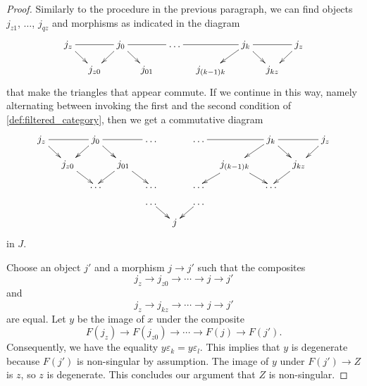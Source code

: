 \begin{proof}
Similarly to the procedure in the previous paragraph, we can find objects $j_{z1}$, $\dots$, $j_{qz}$ and morphisms as indicated in the diagram
\begin{displaymath}
\xymatrix@=1em{
j_z \ar[dr] \ar@{-}[rr] && j_0 \ar[ld] \ar[dr] \ar@{-}[rr] && \dots \ar@{-}[rr] && j_k \ar[ld] \ar[dr] \ar@{-}[rr] && j_z \ar[ld] \\
& j_{z0} && j_{01} && j_{(k-1)k} && j_{kz}
}
\end{displaymath}
that make the triangles that appear commute. If we continue in this way, namely alternating between invoking the first and the second condition of \cref{def:filtered_category}, then we get a commutative diagram
\begin{displaymath}
\xymatrix@=1em{
j_z \ar[dr] \ar@{-}[rr] && j_0 \ar[ld] \ar[dr] \ar@{-}[rr] && \dots && \dots \ar@{-}[rr] && j_k \ar[ld] \ar[dr] \ar@{-}[rr] && j_z \ar[ld] \\
& j_{z0} \ar[dr] && j_{01} \ar[ld] \ar[dr] &&&& j_{(k-1)k} \ar[ld] \ar[dr] && j_{kz} \ar[ld] \\
&& \dots && \dots && \dots && \dots \\
&&&& \dots \ar[dr] && \dots \ar[ld] \\
&&&&& j
}
\end{displaymath}
in $J$.

Choose an object $j'$ and a morphism $j\to j'$ such that the composites
\[j_z\to j_{z0}\to \cdots \to j\to j'\]
and
\[j_z\to j_{kz}\to \cdots \to j\to j'\]
are equal. Let $y$ be the image of $x$ under the composite
\[F(j_z)\to F(j_{z0})\to \cdots \to F(j)\to F(j').\]
Consequently, we have the equality $y\varepsilon _k=y\varepsilon _l$. This implies that $y$ is degenerate because $F(j')$ is non-singular by assumption. The image of $y$ under $F(j')\to Z$ is $z$, so $z$ is degenerate. This concludes our argument that $Z$ is non-singular.
\end{proof}





